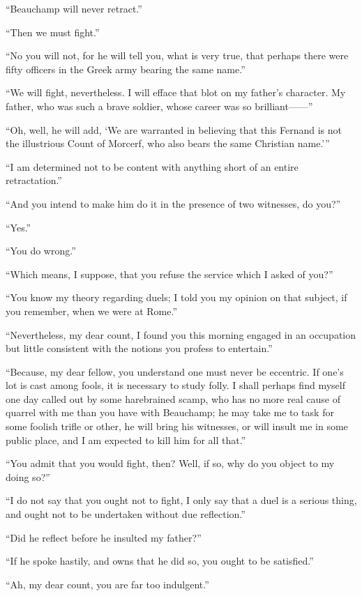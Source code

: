 “Beauchamp will never retract.”

“Then we must fight.”

“No you will not, for he will tell you, what is very true, that perhaps
there were fifty officers in the Greek army bearing the same name.”

“We will fight, nevertheless. I will efface that blot on my father’s
character. My father, who was such a brave soldier, whose career was so
brilliant——”

“Oh, well, he will add, ‘We are warranted in believing that this
Fernand is not the illustrious Count of Morcerf, who also bears the
same Christian name.’”

“I am determined not to be content with anything short of an entire
retractation.”

“And you intend to make him do it in the presence of two witnesses, do
you?”

“Yes.”

“You do wrong.”

“Which means, I suppose, that you refuse the service which I asked of
you?”

“You know my theory regarding duels; I told you my opinion on that
subject, if you remember, when we were at Rome.”

“Nevertheless, my dear count, I found you this morning engaged in an
occupation but little consistent with the notions you profess to
entertain.”

“Because, my dear fellow, you understand one must never be eccentric.
If one’s lot is cast among fools, it is necessary to study folly. I
shall perhaps find myself one day called out by some harebrained scamp,
who has no more real cause of quarrel with me than you have with
Beauchamp; he may take me to task for some foolish trifle or other, he
will bring his witnesses, or will insult me in some public place, and I
am expected to kill him for all that.”

“You admit that you would fight, then? Well, if so, why do you object
to my doing so?”

“I do not say that you ought not to fight, I only say that a duel is a
serious thing, and ought not to be undertaken without due reflection.”

“Did he reflect before he insulted my father?”

“If he spoke hastily, and owns that he did so, you ought to be
satisfied.”

“Ah, my dear count, you are far too indulgent.”

